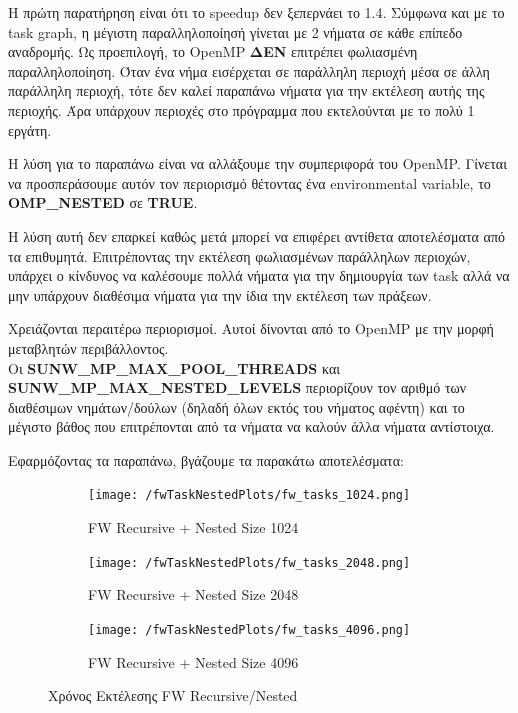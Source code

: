 \documentclass[../final_report.tex]{subfiles}
\begin{document}
Η πρώτη παρατήρηση είναι ότι το speedup δεν ξεπερνάει το 1.4. Σύμφωνα και με το task graph, η μέγιστη
παραλληλοποίησή γίνεται με 2 νήματα σε κάθε επίπεδο αναδρομής. Ως προεπιλογή, το OpenMP \textbf{ΔΕΝ}
επιτρέπει φωλιασμένη παραλληλοποίηση. Όταν ένα νήμα εισέρχεται σε παράλληλη περιοχή μέσα σε άλλη παράλληλη περιοχή,
τότε δεν καλεί παραπάνω νήματα για την εκτέλεση αυτής της περιοχής. Άρα υπάρχουν περιοχές στο πρόγραμμα που εκτελούνται
με το πολύ 1 εργάτη.

Η λύση για το παραπάνω είναι να αλλάξουμε την συμπεριφορά του OpenMP. Γίνεται να προσπεράσουμε αυτόν τον περιορισμό
θέτοντας ένα environmental variable, το \textbf{OMP\_NESTED}
σε \textbf{TRUE}.

Η λύση αυτή δεν επαρκεί καθώς μετά μπορεί να επιφέρει αντίθετα αποτελέσματα από τα επιθυμητά.
Επιτρέποντας την εκτέλεση φωλιασμένων παράλληλων περιοχών, υπάρχει ο κίνδυνος να καλέσουμε πολλά νήματα για την
δημιουργία των task αλλά να μην υπάρχουν διαθέσιμα νήματα για την ίδια την εκτέλεση των πράξεων.

Χρειάζονται περαιτέρω περιορισμοί. Αυτοί δίνονται από το OpenMP με την μορφή μεταβλητών
περιβάλλοντος.
\\
Οι \textbf{SUNW\_MP\_MAX\_POOL\_THREADS} και 
\textbf{SUNW\_MP\_MAX\_NESTED\_LEVELS} περιορίζουν τον αριθμό των διαθέσιμων
νημάτων/δούλων (δηλαδή όλων εκτός του νήματος αφέντη) και το μέγιστο βάθος που επιτρέπονται από τα νήματα να καλούν
άλλα νήματα αντίστοιχα.

Εφαρμόζοντας τα παραπάνω, βγάζουμε τα παρακάτω αποτελέσματα:

\begin{figure}[H]
    \centering
    \begin{subfigure}[b]{0.45\linewidth}
        \texttt{[image: /fwTaskNestedPlots/fw\_tasks\_1024.png]}
        \caption{FW Recursive + Nested Size 1024}
    \end{subfigure}
    \begin{subfigure}[b]{0.45\linewidth}
        \texttt{[image: /fwTaskNestedPlots/fw\_tasks\_2048.png]}
        \caption{FW Recursive + Nested Size 2048}
    \end{subfigure}
    \begin{subfigure}[b]{0.5\linewidth}
        \texttt{[image: /fwTaskNestedPlots/fw\_tasks\_4096.png]}
        \caption{FW Recursive + Nested Size 4096}
    \end{subfigure}
    \caption{Χρόνος Εκτέλεσης FW Recursive/Nested}
    \label{fig:Χρόνος Εκτέλεσης FW Recursive/Nested}
\end{figure}
\end{document}
